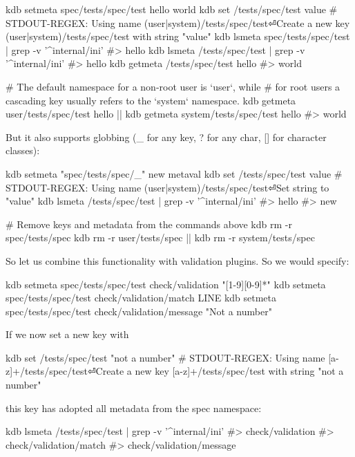 \begin{DoxyCode}
kdb setmeta spec/tests/spec/test hello world
kdb set /tests/spec/test value
# STDOUT-REGEX: Using name (user|system)/tests/spec/test⏎Create a new key (user|system)/tests/spec/test
       with string "value"
kdb lsmeta spec/tests/spec/test | grep -v '^internal/ini'
#> hello
kdb lsmeta /tests/spec/test | grep -v '^internal/ini'
#> hello
kdb getmeta /tests/spec/test hello
#> world

# The default namespace for a non-root user is `user`, while
# for root users a cascading key usually refers to the `system` namespace.
kdb getmeta user/tests/spec/test hello || kdb getmeta system/tests/spec/test hello
#> world
\end{DoxyCode}


But it also supports globbing ({\ttfamily \+\_\+} for any key, {\ttfamily ?} for any char, {\ttfamily \mbox{[}\mbox{]}} for character classes)\+:


\begin{DoxyCode}
kdb setmeta "spec/tests/spec/\_" new metaval
kdb set /tests/spec/test value
# STDOUT-REGEX: Using name (user|system)/tests/spec/test⏎Set string to "value"
kdb lsmeta /tests/spec/test | grep -v '^internal/ini'
#> hello
#> new

# Remove keys and metadata from the commands above
kdb rm -r spec/tests/spec
kdb rm -r user/tests/spec || kdb rm -r system/tests/spec
\end{DoxyCode}


So let us combine this functionality with validation plugins. So we would specify\+:


\begin{DoxyCode}
kdb setmeta spec/tests/spec/test check/validation "[1-9][0-9]*"
kdb setmeta spec/tests/spec/test check/validation/match LINE
kdb setmeta spec/tests/spec/test check/validation/message "Not a number"
\end{DoxyCode}


If we now set a new key with


\begin{DoxyCode}
kdb set /tests/spec/test "not a number"
# STDOUT-REGEX: Using name [a-z]+/tests/spec/test⏎Create a new key [a-z]+/tests/spec/test with string "not
       a number"
\end{DoxyCode}


this key has adopted all metadata from the spec namespace\+:


\begin{DoxyCode}
kdb lsmeta /tests/spec/test | grep -v '^internal/ini'
#> check/validation
#> check/validation/match
#> check/validation/message
\end{DoxyCode}


